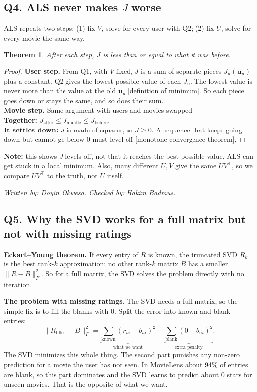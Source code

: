 \documentclass[11pt]{article}
\newtheorem{theorem}{Theorem}
\theoremstyle{definition}
\newcommand{\checked}[2]{\par\smallskip\noindent\textit{Written by: #1. \quad Checked by: #2.}\par}
\begin{document}
\subsection*{Q4. ALS never makes $J$ worse}
ALS repeats two steps: (1) fix $V$, solve for every user with Q2; (2) fix $U$, solve for every movie the same way.
\begin{theorem}
After each step, $J$ is less than or equal to what it was before.
\end{theorem}
\begin{proof}
\textbf{User step.} From Q1, with $V$ fixed, $J$ is a sum of separate pieces $J_u(\mathbf u_u)$ plus a constant. Q2 gives the lowest possible value of each $J_u$. The lowest value is never more than the value at the old $\mathbf u_u$ [definition of minimum]. So each piece goes down or stays the same, and so does their sum.\\
\textbf{Movie step.} Same argument with users and movies swapped.\\
\textbf{Together:} $J_{\text{after}}\le J_{\text{middle}}\le J_{\text{before}}$.\\
\textbf{It settles down:} $J$ is made of squares, so $J\ge0$. A sequence that keeps going down but cannot go below 0 must level off [monotone convergence theorem].
\end{proof}
\noindent\textbf{Note:} this shows $J$ levels off, not that it reaches the best possible value. ALS can get stuck in a local minimum. Also, many different $U,V$ give the same $UV^\top$, so we compare $UV^\top$ to the truth, not $U$ itself.
\checked{Doyin Okwesa}{Hakim Badmus}

\subsection*{Q5. Why the SVD works for a full matrix but not with missing ratings}
\textbf{Eckart--Young theorem.} If every entry of $R$ is known, the truncated SVD $R_k$ is the best rank-$k$ approximation: no other rank-$k$ matrix $B$ has a smaller $\|R-B\|_F^2$. So for a full matrix, the SVD solves the problem directly with no iteration.

\textbf{The problem with missing ratings.} The SVD needs a full matrix, so the simple fix is to fill the blanks with 0. Split the error into known and blank entries:
\[
\|R_{\text{filled}}-B\|_F^2=\underbrace{\sum_{\text{known}}(r_{ui}-b_{ui})^2}_{\text{what we want}}+\underbrace{\sum_{\text{blank}}(0-b_{ui})^2}_{\text{extra penalty}} .
\]
The SVD minimizes this whole thing. The second part punishes any non-zero prediction for a movie the user has not seen. In MovieLens about 94\% of entries are blank, so this part dominates and the SVD learns to predict about 0 stars for unseen movies. That is the opposite of what we want.
\end{document}
